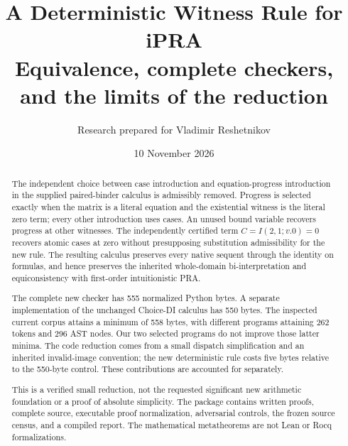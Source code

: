 \documentclass[11pt,letterpaper]{article}
\title{\color{ink}\bfseries A Deterministic Witness Rule for iPRA\\[8pt]
\large Equivalence, complete checkers, and the limits of the reduction}
\author{Research prepared for Vladimir Reshetnikov}
\date{10 November 2026}
\theoremstyle{definition}\newtheorem{definition}[theorem]{Definition}
\theoremstyle{remark}\newtheorem{remark}[theorem]{Remark}
\begin{document}
\maketitle
\begin{abstract}
The independent choice between case introduction and equation-progress
introduction in the supplied paired-binder calculus is admissibly removed.
Progress is selected exactly when the matrix is a literal equation and
the existential witness is the literal zero term; every other introduction
uses cases. An unused bound variable recovers progress at other witnesses.
The independently certified term $C=I(2,1;v.0)=0$ recovers atomic cases at
zero without presupposing substitution admissibility for the new rule.
The resulting calculus preserves every native sequent through the identity
on formulas, and hence preserves the inherited whole-domain
bi-interpretation and equiconsistency with first-order intuitionistic PRA.

The complete new checker has 555 normalized Python bytes. A separate
implementation of the unchanged Choice-DI calculus has 550 bytes. The
inspected current corpus attains a minimum of 558 bytes, with different
programs attaining 262 tokens and 296 AST nodes. Our two selected programs
do not improve those latter minima. The code reduction comes from a
small dispatch simplification and an inherited invalid-image convention;
the new deterministic rule costs five bytes relative to the 550-byte
control. These contributions are accounted for separately.

This is a verified small reduction, not the requested significant new
arithmetic foundation or a proof of absolute simplicity. The package
contains written proofs, complete source, executable proof normalization,
adversarial controls, the frozen source census, and a compiled report.
The mathematical metatheorems are not Lean or Rocq formalizations.
\end{abstract}
\begin{center}
\end{center}
\clearpage
\setcounter{tocdepth}{1}
\hypersetup{bookmarksdepth=2}
\begingroup\small\setlength{\parskip}{0pt}\tableofcontents\endgroup
\clearpage
\end{document}
